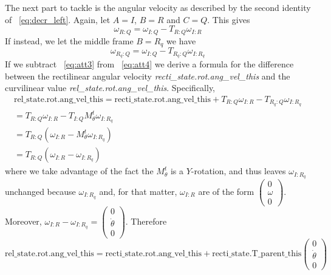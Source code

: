 The next part to tackle is the angular velocity as described by the second
identity of ~\ref{eq:decr_left}. Again, let $A=I$, $B=R$ and $C=Q$. This gives
\begin{equation}
\omega_{R:Q} = \omega_{I:Q} - T_{R:Q}\omega_{I:R}
\label{eq:att3}
\end{equation}
If instead, we let the middle frame $B = R_q$ we have
\begin{equation}
\omega_{R_q:Q} = \omega_{I:Q} - T_{R_q:Q}\omega_{I:R_q}
\label{eq:att4}
\end{equation}
If we subtract ~\ref{eq:att3} from ~\ref{eq:att4} we derive a formula for the
difference between the rectilinear angular velocity \textit{recti\_state.rot.ang\_vel\_this}
and the curvilinear value \textit{rel\_state.rot.ang\_vel\_this}. Specifically,
\begin{eqnarray}
\mbox{rel\_state.rot.ang\_vel\_this} = \mbox{recti\_state.rot.ang\_vel\_this} + T_{R:Q}\omega_{I:R} - T_{R_q:Q}\omega_{I:R_q} \\ \nonumber
= T_{R:Q}\omega_{I:R} - T_{I:Q}M_\theta^t\omega_{I:R_q} \\ \nonumber
= T_{R:Q}(\omega_{I:R} - M_\theta^t\omega_{I:R_q}) \\ \nonumber
= T_{R:Q}(\omega_{I:R}-\omega_{I:R_q})
\label{eq:att5}
\end{eqnarray}
\noindent where we take advantage of the fact the $M_\theta^t$ is a
$Y$-rotation, and thus leaves $\omega_{I:R_q}$ unchanged because $\omega_{I:R_q}$
and, for that matter, $\omega_{I:R}$ are of the form
$\left ( \begin{array}{c} 0 \\ \omega \\ 0 \end{array} \right )$. Moreover, 
$\omega_{I:R} - \omega_{I:R_q} =
\left ( \begin{array}{c} 0 \\ \dot\theta \\ 0 \end{array} \right )$.
Therefore
\begin{equation}
\mbox{rel\_state.rot.ang\_vel\_this} = \mbox{recti\_state.rot.ang\_vel\_this} +
\mbox{recti\_state.T\_parent\_this}
\left ( \begin{array}{c} 0 \\ \dot\theta \\ 0 \end{array} \right )
\label{eq:att6}
\end{equation}

